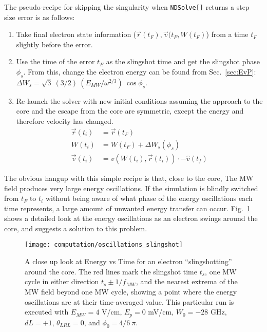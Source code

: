 \documentclass[aps,pra,preprint,groupedaddress]{revtex4-1}
\begin{document}
The pseudo-recipe for skipping the singularity when \texttt{NDSolve[]} returns a step size error is as follows:
\begin{enumerate}
	\item Take final electron state information ($\vec{r}(t_{F}), \vec{v}(t_{F}, W(t_{F})$) from a time $t_F$ slightly before the error.
	\item Use the time of the error $t_E$ as the slingshot time and get the slingshot phase $\phi_s$. From this, change the electron energy can be found from Sec.~\ref{sec:EvP}:  $\Delta W_{s} = \sqrt{3} ~ (3/2) ~ (E_{MW}/\omega^{2/3}) ~ \cos{\phi_s}$.
	\item Re-launch the solver with new initial conditions assuming the approach to the core and the escape from the core are symmetric, except the energy and therefore velocity has changed. \begin{align*}
	\vec{r}(t_i) & = \vec{r}(t_F) \\
	W(t_i) & = W(t_F) + \Delta W_s(\phi_s) \\
	\vec{v}(t_i) & = v(W(t_i), \vec{r}(t_i)) \cdot -\hat{v}(t_f)
	\end{align*}
\end{enumerate}

The obvious hangup with this simple recipe is that, close to the core, The MW field produces very large energy oscillations. If the simulation is blindly switched from $t_F$ to $t_i$ without being aware of what phase of the energy oscillations each time represents, a large amount of unwanted energy transfer can occur. Fig.~\ref{fig:oscsling} shows a detailed look at the energy oscillations as an electron swings around the core, and suggests a solution to this problem.

\begin{figure}
\texttt{[image: computation/oscillations\_slingshot]}
\caption{\label{fig:oscsling} A close up look at Energy vs Time for an electron ``slingshotting'' around the core. The red lines mark the slingshot time $t_s$, one MW cycle in either direction $t_s \pm 1/f_{MW}$, and the nearest extrema of the MW field beyond one MW cycle, showing a point where the energy oscillations are at their time-averaged value. This particular run is executed with $E_{MW} = 4$ V/cm, $E_p = 0$ mV/cm, $W_0 = -28$ GHz, $dL = +1$, $\theta_{LRL} = 0$, and $\phi_0 = 4/6 ~ \pi$.}
\end{figure}
\end{document}
